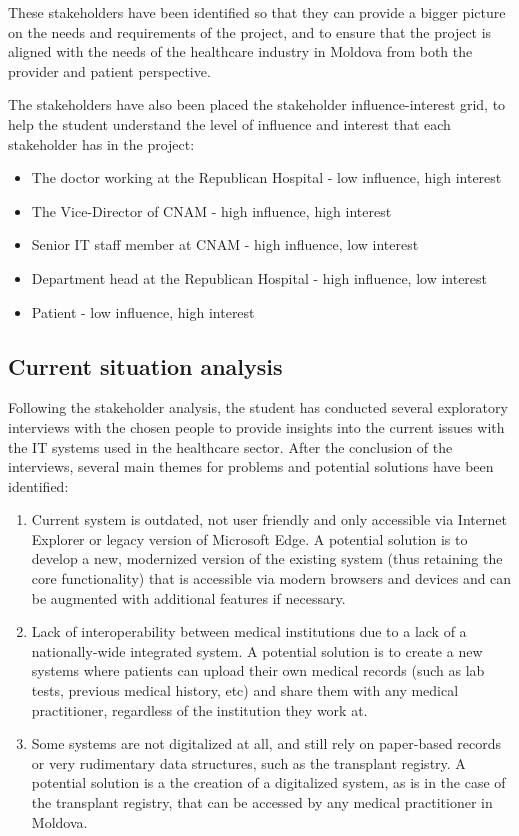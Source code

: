 These stakeholders have been identified so that they can provide a bigger picture on the needs and requirements of the project, and to ensure that the project is aligned with the needs of the healthcare industry in Moldova from both the provider and patient perspective. 

The stakeholders have also been placed the stakeholder influence-interest grid, to help the student understand the level of influence and interest that each stakeholder has in the project:

\begin{itemize}
    \item The doctor working at the Republican Hospital - low influence, high interest
    \item The Vice-Director of CNAM - high influence, high interest
    \item Senior IT staff member at CNAM - high influence, low interest
    \item Department head at the Republican Hospital - high influence, low interest
    \item Patient - low influence, high interest
\end{itemize}

\subsection{Current situation analysis}

Following the stakeholder analysis, the student has conducted several exploratory interviews with the chosen people to provide insights into the current issues with the IT systems used in the healthcare sector. After the conclusion of the interviews, several main themes for problems and potential solutions have been identified:

\begin{enumerate}
    \item Current system is outdated, not user friendly and only accessible via Internet Explorer or legacy version of Microsoft Edge. A potential solution is to develop a new, modernized version of the existing system (thus retaining the core functionality) that is accessible via modern browsers and devices and can be augmented with additional features if necessary.
    \item Lack of interoperability between medical institutions due to a lack of a nationally-wide integrated system. A potential solution is to create a new systems where patients can upload their own medical records (such as lab tests, previous medical history, etc) and share them with any medical practitioner, regardless of the institution they work at. 
    \item Some systems are not digitalized at all, and still rely on paper-based records or very rudimentary data structures, such as the transplant registry. A potential solution is a the creation of a digitalized system, as is in the case of the transplant registry, that can be accessed by any medical practitioner in Moldova.
\end{enumerate}

